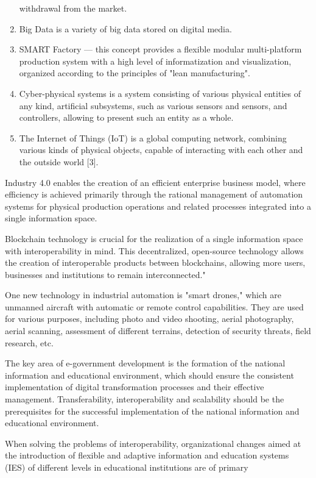 \documentclass[10pt, a4paper]{article}
\begin{document}
\begin{multicols}{2}
\begin{enumerate}
withdrawal from the market.
\item[2)] Big Data is a variety of big data stored on digital
media.
\item[3)] SMART Factory — this concept provides a flexible
modular multi-platform production system with
a high level of informatization and visualization,
organized according to the principles of "lean
manufacturing".
\item[4)] Cyber-physical systems is a system consisting of
various physical entities of any kind, artificial
subsystems, such as various sensors and sensors,
and controllers, allowing to present such an entity
as a whole.
\item[5)] The Internet of Things (IoT) is a global computing network, combining various kinds of physical
objects, capable of interacting with each other and
the outside world [3].
\end{enumerate}
Industry 4.0 enables the creation of an efficient enterprise business model, where efficiency is achieved
primarily through the rational management of automation
systems for physical production operations and related
processes integrated into a single information space.
\par
Blockchain technology is crucial for the realization of
a single information space with interoperability in mind.
This decentralized, open-source technology allows the
creation of interoperable products between blockchains,
allowing more users, businesses and institutions to remain interconnected."
\par
One new technology in industrial automation is "smart
drones," which are unmanned aircraft with automatic or
remote control capabilities. They are used for various
purposes, including photo and video shooting, aerial
photography, aerial scanning, assessment of different
terrains, detection of security threats, field research, etc.
\par
The key area of e-government development is the
formation of the national information and educational
environment, which should ensure the consistent implementation of digital transformation processes and
their effective management. Transferability, interoperability and scalability should be the prerequisites for the
successful implementation of the national information
and educational environment.
\par
When solving the problems of interoperability, organizational changes aimed at the introduction of flexible
and adaptive information and education systems (IES) of
different levels in educational institutions are of primary

\end{multicols}
\end{document}
